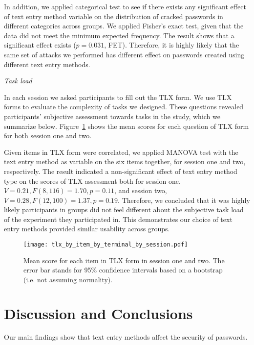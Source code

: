 \documentclass[conference]{IEEEtran}
\begin{document}
In addition, we applied categorical test to see if there exists any significant effect of text entry method variable on the distribution of cracked passwords in different categories across groups. We applied Fisher's exact test, given that the data did not meet the minimum expected frequency. The result shows that a significant effect exists ($p=0.031$, FET). Therefore, it is highly likely that the same set of attacks we performed has different effect on passwords created using different text entry methods.

\textit{Task load}

In each session we asked participants to fill out the TLX form. We use TLX forms to evaluate the complexity of tasks we designed.  These questions revealed participants' subjective assessment towards tasks in the study, which we summarize below. Figure~\ref{fig:tlx_by_item_by_terminal_by_session} shows the mean scores for each question of TLX form for both session one and two. 

Given items in TLX form were correlated, we applied MANOVA test with the text entry method as variable on the six items together, for session one and two, respectively. The result indicated a non-significant effect of text entry method type on the scores of TLX assessment both for session one, $V=0.21, F(8, 116)=1.70, p=0.11$, and session two, $V=0.28, F(12, 100)=1.37, p=0.19$. Therefore, we concluded that it was highly likely participants in groups did not feel different about the subjective task load of the experiment they participated in. This demonstrates our choice of text entry methods provided similar usability across groups.

\begin{figure}
\texttt{[image: tlx\_by\_item\_by\_terminal\_by\_session.pdf]}
\caption{\label{fig:tlx_by_item_by_terminal_by_session} Mean score for each item in TLX form in session one and two. The error bar stands for 95\% confidence intervals based on a bootstrap (i.e. not assuming normality).}
\vspace{-9pt}
\end{figure}




\section{Discussion and Conclusions}



Our main findings show that text entry methods affect the security of passwords.
\end{document}
